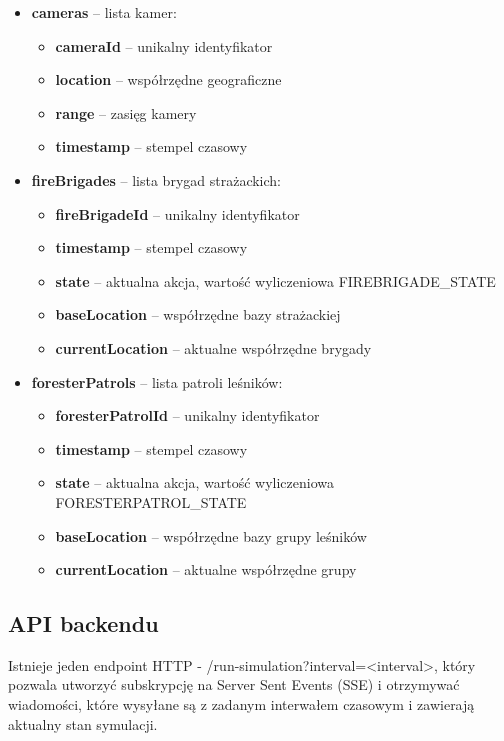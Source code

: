 \begin{itemize}
\begin{itemize}
        \item \textbf{location} – współrzędne geograficzne
        \item \textbf{timestamp} – stempel czasowy
    \end{itemize}
    \item \textbf{cameras} – lista kamer:
    \begin{itemize}
        \item \textbf{cameraId} – unikalny identyfikator
        \item \textbf{location} – współrzędne geograficzne
        \item \textbf{range} – zasięg kamery
        \item \textbf{timestamp} – stempel czasowy
    \end{itemize}
    \item \textbf{fireBrigades} – lista brygad strażackich:
    \begin{itemize}
        \item \textbf{fireBrigadeId} – unikalny identyfikator
        \item \textbf{timestamp} – stempel czasowy
        \item \textbf{state} – aktualna akcja, wartość wyliczeniowa FIREBRIGADE\_STATE
        \item \textbf{baseLocation} – współrzędne bazy strażackiej
        \item \textbf{currentLocation} – aktualne współrzędne brygady
    \end{itemize}
    \item \textbf{foresterPatrols} – lista patroli leśników:
    \begin{itemize}
        \item \textbf{foresterPatrolId} – unikalny identyfikator
        \item \textbf{timestamp} – stempel czasowy
        \item \textbf{state} – aktualna akcja, wartość wyliczeniowa FORESTERPATROL\_STATE
        \item \textbf{baseLocation} – współrzędne bazy grupy leśników
        \item \textbf{currentLocation} – aktualne współrzędne grupy
    \end{itemize}
\end{itemize}

\subsection{API backendu}
Istnieje jeden endpoint HTTP - /run-simulation?interval=<interval>, który pozwala utworzyć subskrypcję na Server Sent Events (SSE) i otrzymywać wiadomości, które wysyłane są z zadanym interwałem czasowym i zawierają aktualny stan symulacji. 


